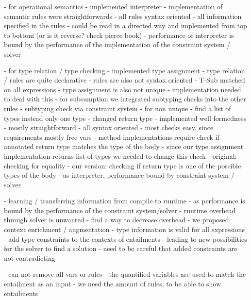 - for operational semantics
  - implemented interpreter
  - implementation of semantic rules were straightforwards
  - all rules syntax oriented
  - all information specified in the rules
  - could be read in a directed way and implemented from top to bottom (or is it reverse? check pierce book)
  - performance of interpreter is bound by the performance of the implementation of the constraint system / solver

- for type relation / type checking
  - implemented type assignment
    - type relation / rules are quite declarative
    - rules are also not syntax oriented
      - T-Sub matched on all expressions
    - type assignment is also not unique
  - implementation needed to deal with this
    - for subsumption we integrated subtyping checks into the other rules
      - subtyping check via constraint system
    - for non unique
      - find a list of types instead only one type
      - changed return type
  - implemented well formedness
    - mostly straightforward
    - all syntax oriented
    - most checks easy, since requirements mostly free vars
    - method implementations require check if annotated return type matches the type of the body
      - since our type assignment implementation returns list of types
        we needed to change this check
      - original: checking for equality
      - our version: checking if return type is one of the possible types of the body
  - as interpreter, performance bound by constraint system / solver
  
- learning / transferring information from compile to runtime
  - as performance is bound by the performance of the constraint system/solver
  - runtime overhead through solver is unwanted
  - find a way to decrease overhead
  - we proposed: context enrichment / augmentation
  - type information is valid for all expressions
  - add type constraints to the contexts of entailments
  - leading to new possibilities for the solver to find a solution
  - need to be careful that added constraints are not contradicting

- can not remove all vars or rules
- the quantified variables are used to match the entailment as an input
- we need the amount of rules, to be able to show entailments


